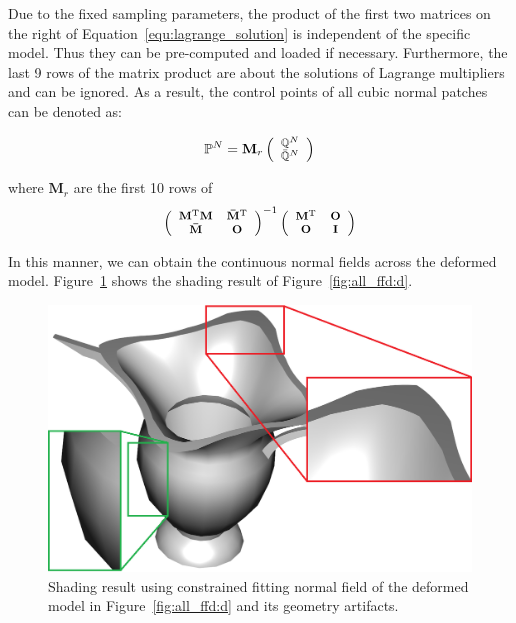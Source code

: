 \documentclass[3p]{elsarticle}
\begin{document}
Due to the fixed sampling parameters, the product of the first two matrices on the right of
Equation~\ref{equ:lagrange_solution} is independent of the specific model. Thus they can be pre-computed and loaded if
necessary. Furthermore, the last 9 rows of the matrix product are about the solutions of Lagrange multipliers and can be
ignored. As a result, the control points of all cubic normal patches can be denoted as:

\begin{equation}
	\footnotesize
	\mathbb P^N = \mathbf M_r
	\left(
		\begin{array}{c}
			\mathbb Q^N\\
			\mathbb {\bar Q}^N
		\end{array}
	\right)
	\label{equ:ctrl_points_solution_n}
\end{equation}

\noindent where $\mathbf M_r$ are the first 10 rows of
$$
	\footnotesize
	\left(
		\begin{array}{cc}
			\mathbf M^{\mathrm T}\mathbf M & \mathbf{\bar M}^{\mathrm T} \\
			\mathbf{\bar M} & \mathbf O
		\end{array}
	\right)^{-1}
	\left(
		\begin{array}{cc}
			\mathbf M^{\mathrm T}& \mathbf O\\
			\mathbf O &\mathbf I
		\end{array}
	\right)
$$

In this manner, we can obtain the continuous normal fields across the deformed model. Figure~\ref{fig:normal_refinement}
shows the shading result of Figure~\ref{fig:all_ffd:d}.

\begin{figure}
	\centering
	\includegraphics[width=\linewidth]{pic/normal_refinement_2.png}
	\caption{Shading result using constrained fitting normal field of the deformed model in Figure~\ref{fig:all_ffd:d}
	and its geometry artifacts.}
	\label{fig:normal_refinement}
\end{figure}
\end{document}

